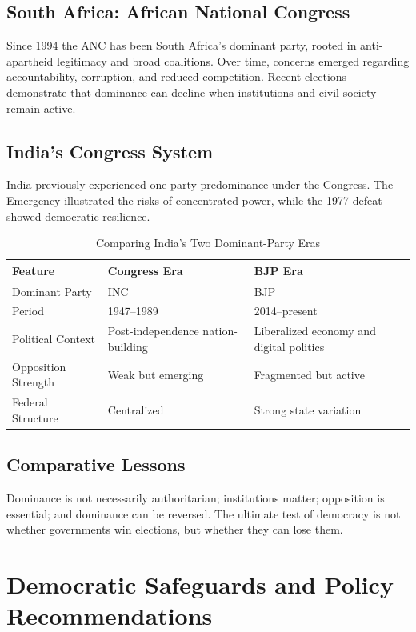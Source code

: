 \documentclass[11pt]{article}
\begin{document}
\subsection{South Africa: African National Congress}
Since 1994 the ANC has been South Africa's dominant party, rooted in anti-apartheid legitimacy and broad coalitions. Over time, concerns emerged regarding accountability, corruption, and reduced competition. Recent elections demonstrate that dominance can decline when institutions and civil society remain active.

\subsection{India's Congress System}
India previously experienced one-party predominance under the Congress. The Emergency illustrated the risks of concentrated power, while the 1977 defeat showed democratic resilience.

\begin{table}[h]
\centering
\caption{Comparing India's Two Dominant-Party Eras}
\begin{tabularx}{\textwidth}{lXX}
\toprule
Feature & Congress Era & BJP Era\\
\midrule
Dominant Party & INC & BJP\\
Period & 1947--1989 & 2014--present\\
Political Context & Post-independence nation-building & Liberalized economy and digital politics\\
Opposition Strength & Weak but emerging & Fragmented but active\\
Federal Structure & Centralized & Strong state variation\\
\bottomrule
\end{tabularx}
\end{table}

\subsection{Comparative Lessons}
Dominance is not necessarily authoritarian; institutions matter; opposition is essential; and dominance can be reversed. The ultimate test of democracy is not whether governments win elections, but whether they can lose them.

\section{Democratic Safeguards and Policy Recommendations}
\end{document}
